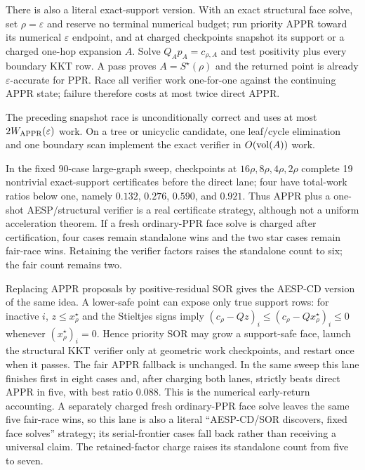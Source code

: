 There is also a literal exact-support version.  With an exact structural
face solve, set $\rho=\varepsilon$ and reserve no terminal numerical budget;
run priority APPR toward its numerical $\varepsilon$ endpoint, and at charged
checkpoints snapshot its support or a charged one-hop expansion $A$.  Solve
$Q_Ap_A=c_{\rho,A}$ and test positivity plus every boundary KKT row.  A pass
proves $A=S^\star(\rho)$ and the returned point is already
$\varepsilon$-accurate for PPR.  Race all verifier work one-for-one against
the continuing APPR state; failure therefore costs at most twice direct APPR.
\begin{theorem}
\label{thm:short-appr-face-race}
The preceding snapshot race is unconditionally correct and uses at most
$2W_{\rm APPR}(\varepsilon)$ work.  On a tree or unicyclic candidate, one
leaf/cycle elimination and one boundary scan implement the exact verifier in
$O(\operatorname{vol}(A))$ work.
\end{theorem}
In the fixed 90-case large-graph sweep, checkpoints at
$16\rho,8\rho,4\rho,2\rho$ complete 19 nontrivial exact-support certificates
before the direct lane; four have total-work ratios below one, namely $0.132$,
$0.276$, $0.590$, and $0.921$.  Thus APPR plus a one-shot AESP/structural verifier is a real
certificate strategy, although not a uniform acceleration theorem.  If a
fresh ordinary-PPR face solve is charged after certification, four cases
remain standalone wins and the two star cases remain fair-race wins.
Retaining the verifier factors raises the standalone count to six; the fair
count remains two.

Replacing APPR proposals by positive-residual SOR gives the AESP-CD version
of the same idea.  A lower-safe point can expose only true support rows:
for inactive $i$, $z\leq x_\rho^\star$ and the Stieltjes signs imply
$(c_\rho-Qz)_i\leq(c_\rho-Qx_\rho^\star)_i\leq0$ whenever
$(x_\rho^\star)_i=0$.  Hence priority SOR may grow a support-safe face,
launch the structural KKT verifier only at geometric work checkpoints, and
restart once when it passes.  The fair APPR fallback is unchanged.  In the
same sweep this lane finishes first in eight cases and, after charging both
lanes, strictly beats direct APPR in five, with best ratio $0.088$.  This is
the numerical early-return accounting.  A separately charged fresh
ordinary-PPR face solve leaves the same five fair-race wins, so this lane is
also a literal ``AESP-CD/SOR discovers, fixed face solves'' strategy; its
serial-frontier cases fall back rather than receiving a universal claim.
The retained-factor charge raises its standalone count from five to seven.

